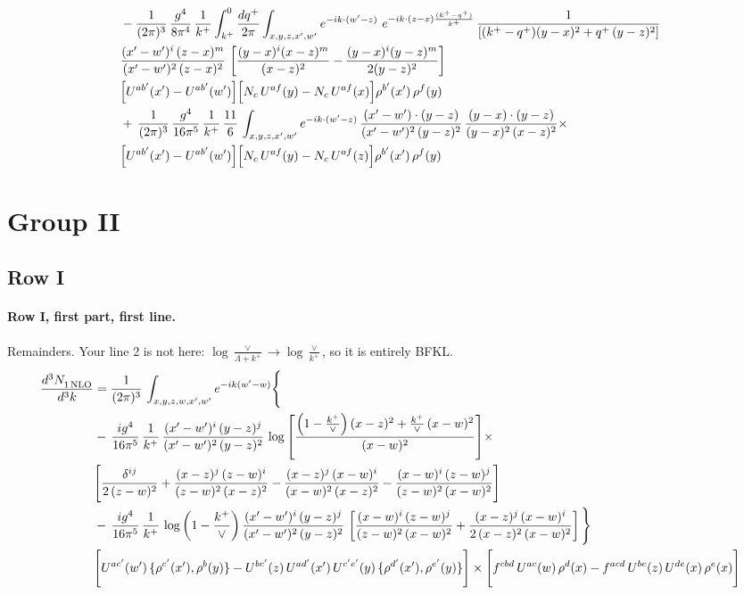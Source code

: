\documentclass[10pt]{article}
\numberwithin{equation}{section}
\begin{document}
\begin{align}
& - \frac{1}{(2\pi)^{3}}\,\frac{g^{4}}{8\pi^{4}}\,\frac{1}{k^{+}}\int_{k^{+}}^{0}\frac{dq^{+}}{2\pi}\int_{x,y,z,x',w'}e^{-ik\cdot(w'-z)}\ e^{-ik\cdot(z-x)\frac{(k^{+}-q^{+})}{k^{+}}}\,\frac{1}{\left[(k^{+}-q^{+})(y-x)^{2}+q^{+}\,(y-z)^{2}\right]}\notag \\ & \frac{(x'-w')^{i}\,(z-x)^{m}}{(x'-w')^{2}\,(z-x)^{2}}\,\left[\frac{(y-x)^{i}(x-z)^{m}}{(x-z)^{2}}-\frac{(y-x)^{i}(y-z)^{m}}{2(y-z)^{2}}\right]\notag \\ & \Big[U^{ab'}(x')-U^{ab'}(w')\Big]\Big[N_{c}\,U^{af}(y)-N_{c}\,U^{af}(x)\Big]\rho^{b'}(x')\,\rho^{f}(y) \notag \\
& +\, \frac{1}{(2\pi)^{3}}\,\frac{g^{4}}{16\pi^{5}}\,\frac{1}{k^{+}}\,\frac{11}{6}\,\int_{x,y,z,x',w'}e^{-ik\cdot(w'-z)}\, \frac{(x'-w')\cdot(y-z)}{(x'-w')^{2}\,(y-z)^{2}}\,\frac{(y-x)\cdot(y-z)}{(y-x)^{2}\,(x-z)^{2}}\times\notag \\ & \Big[U^{ab'}(x')-U^{ab'}(w')\Big]\Big[N_{c}\,U^{af}(y)-N_{c}\,U^{af}(z)\Big]\rho^{b'}(x')\,\rho^{f}(y) \label{eq:R:G1V2bfin}
\end{align}

\section{Group II}\label{sec:RgII}
\subsection{Row I}
\paragraph{Row I, first part, first line.}
Remainders. Your line 2 is not here: $\log\frac{\vee}{\Lambda+k^+}\to\log\frac{\vee}{k^+}$, so it is entirely BFKL.
\begin{align}
 \frac{d^{3}N_{1\,\rm NLO}^{\rm}}{d^{3}k}  & =     \frac{1}{(2\pi)^{3}}\,\int_{x,y,z,w,x',w^{\prime}} e^{-ik(w^{\prime}-w)}\Bigg\{\notag \\
& -\, \frac{ig^{4}}{16\pi^{5}}\,\frac{1}{k^{+}}\, \frac{(x'-w')^{i}\,(y-z)^{j}}{(x'-w')^{2}\,(y-z)^{2}}\,\log{\left[\frac{\left(1-\frac{k^{+}}{\vee}\right)(x-z)^{2}+\frac{k^{+}}{\vee}\,(x-w)^{2}}{(x-w)^{2}}\right]}\times\notag \\ &  \Bigg[\frac{\delta^{ij}}{2\,(z-w)^{2}}+\frac{(x-z)^{j}\,(z-w)^{i}}{(z-w)^{2}\,(x-z)^{2}}-\frac{(x-z)^{j}\,(x-w)^{i}}{(x-w)^{2}\,(x-z)^{2}}-\frac{(x-w)^{i}\,(z-w)^{j}}{(z-w)^{2}\,(x-w)^{2}}\Bigg] \notag \\
& -\, \frac{ig^{4}}{16\pi^{5}}\,\frac{1}{k^{+}}\,\log{\left(1-\frac{k^{+}}{\vee}\right)}\,\frac{(x'-w')^{i}\,(y-z)^{j}}{(x'-w')^{2}\,(y-z)^{2}}\,\left[\frac{(x-w)^{i}\,(z-w)^{j}}{(z-w)^{2}\,(x-w)^{2}}+\frac{(x-z)^{j}\,(x-w)^{i}}{2\,(x-z)^{2}\, (x-w)^{2}}\right]\Bigg\} \notag \\ & \Bigg[U^{ac'}(w')\,\{\rho^{c'}(x'),\rho^{b}(y)\}-U^{bc'}(z)\,U^{ad'}(x')\,U^{c'e'}(y)\, \{\rho^{d'}(x'),\rho^{e'}(y)\}\Bigg]\times \Bigg[f^{cbd}\,U^{ac}(w)\,\rho^{d}(x)-f^{acd}\, U^{bc}(z)\,U^{de}(x)\,\rho^{e}(x)\Bigg]\notag \\ \label{eq:R:G2I1A}
\end{align}
\end{document}
